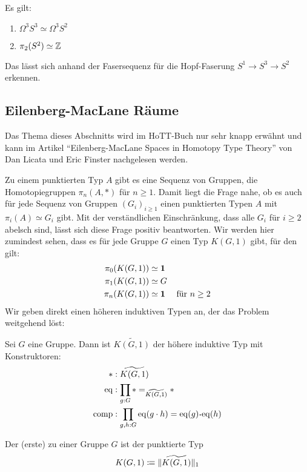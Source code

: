 \begin{theorem}
  Es gilt:
  \begin{enumerate}
  \item $\Omega^3S^3\simeq \Omega^3S^2$
  \item $\pi_2(S^2)\simeq \mathbb{Z}$
  \end{enumerate}
\end{theorem}
\begin{beweis}[Ansatz]
  Das lässt sich anhand der Fasersequenz für die Hopf-Faserung $S^1\to S^3\to S^2$ erkennen.
\end{beweis}

\subsection{Eilenberg-MacLane Räume}
Das Thema dieses Abschnitts wird im HoTT-Buch nur sehr knapp erwähnt und kann im Artikel ``Eilenberg-MacLane Spaces in Homotopy Type Theory'' von Dan Licata und Eric Finster nachgelesen werden.

Zu einem punktierten Typ $A$ gibt es eine Sequenz von Gruppen, die Homotopiegruppen $\pi_n(A,\ast)$ für $n\geq 1$.
Damit liegt die Frage nahe, ob es auch für jede Sequenz von Gruppen $(G_i)_{i\geq 1}$ einen punktierten Typen $A$ mit $\pi_i(A)\simeq G_i$ gibt.
Mit der verständlichen Einschränkung, dass alle $G_i$ für $i\geq 2$ abelsch sind, lässt sich diese Frage positiv beantworten.
Wir werden hier zumindest sehen, dass es für jede Gruppe $G$ einen Typ $K(G,1)$ gibt, für den gilt:
\begin{align*}
  \pi_0(K(G,1))&\simeq \mathbf{1} \\
  \pi_1(K(G,1))&\simeq G \\
  \pi_n(K(G,1))&\simeq \mathbf{1}\quad\text{ für $n\geq 2$}
\end{align*}
Wir geben direkt einen höheren induktiven Typen an, der das Problem weitgehend löst:
\begin{regeln}
  Sei $G$ eine Gruppe. Dann ist $\widetilde{K(G,1)}$ der höhere induktive Typ mit Konstruktoren:
  \begin{align*}
    \ast&:\widetilde{K(G,1)} \\
    \mathrm{eq}&:\prod_{g:G}\ast=_{\widetilde{K(G,1)}}\ast \\
    \mathrm{comp}&:\prod_{g,h:G} \mathrm{eq}(g\cdot h)=\mathrm{eq}(g)\kon \mathrm{eq}(h)
  \end{align*}
\end{regeln}

\begin{definition}
  Der (erste)  zu einer Gruppe $G$ ist der punktierte Typ
  \[
    K(G,1)\vcentcolon\mspace{-1.2mu}\equiv \|\widetilde{K(G,1)}\|_1
  \]
\end{definition}

